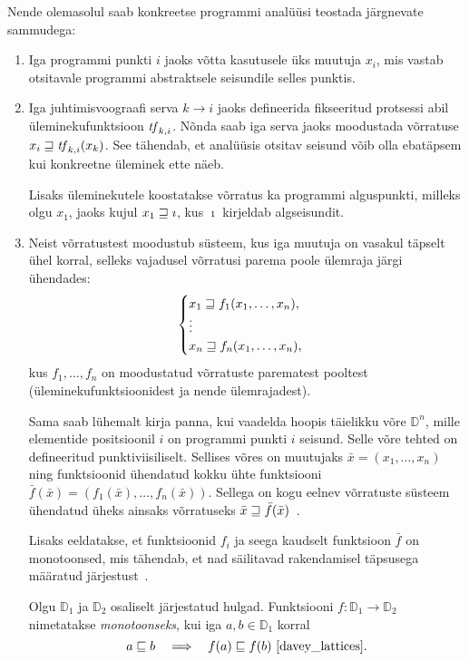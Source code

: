 \documentclass[../thesis.tex]{subfiles}
\begin{document}
Nende olemasolul saab konkreetse programmi analüüsi teostada järgnevate sammudega:
\begin{enumerate}
	\item Iga programmi punkti $i$ jaoks võtta kasutusele üks muutuja $x_i$, mis vastab otsitavale programmi abstraktsele seisundile selles punktis.

	\item Iga juhtimisvoograafi serva $k \rightarrow i$ jaoks defineerida fikseeritud protsessi abil üleminekufunktsioon $\mathit{tf}_{k,i}$. Nõnda saab iga serva jaoks moodustada võrratuse $x_i \sqsupseteq \mathit{tf}_{k,i}(x_k)$. See tähendab, et analüüsis otsitav seisund võib olla ebatäpsem kui konkreetne üleminek ette näeb.

	Lisaks üleminekutele koostatakse võrratus ka programmi alguspunkti, milleks olgu $x_1$, jaoks kujul $x_1 \sqsupseteq \imath$, kus $\imath$ kirjeldab algseisundit.

	\item Neist võrratustest moodustub süsteem, kus iga muutuja on vasakul täpselt ühel korral, selleks vajadusel võrratusi parema poole ülemraja järgi ühendades:
	\[
		\begin{cases}
			x_1 \sqsupseteq f_1(x_1, \ldots, x_n), \\
			\vdots \\
			x_n \sqsupseteq f_n(x_1, \ldots, x_n),
		\end{cases}
	\]
	kus $f_1, \ldots, f_n$ on moodustatud võrratuste parematest pooltest (üleminekufunktsioonidest ja nende ülemrajadest).

	Sama saab lühemalt kirja panna, kui vaadelda hoopis täielikku võre $\mathbb{D}^n$, mille elementide positsioonil $i$ on programmi punkti $i$ seisund. Selle võre tehted on defineeritud punktiviisiliselt.
	Sellises võres on muutujaks $\bar{x} = (x_1, \ldots, x_n)$ ning funktsioonid ühendatud kokku ühte funktsiooni $\bar{f}(\bar{x}) = (f_1(\bar{x}), \ldots, f_n(\bar{x}))$. Sellega on kogu eelnev võrratuste süsteem ühendatud üheks ainsaks võrratuseks $\bar{x} \sqsupseteq \bar{f}(\bar{x})$~\cite[21]{seidl_foundations}.

	Lisaks eeldatakse, et funktsioonid $f_i$ ja seega kaudselt funktsioon $\bar{f}$ on monotoonsed, mis tähendab, et nad säilitavad rakendamisel täpsusega määratud järjestust~\cite[20]{seidl_foundations}.

	\begin{definition}
	Olgu $\mathbb{D}_1$ ja $\mathbb{D}_2$ osaliselt järjestatud hulgad. Funktsiooni $f: \mathbb{D}_1 \to \mathbb{D}_2$ nimetatakse \emph{monotoonseks}, kui iga $a, b \in \mathbb{D}_1$ korral
	\[
		a \sqleq b \quad\Longrightarrow\quad f(a) \sqleq f(b)~\text{\cite[23]{davey_lattices}}.
	\]
	\end{definition}


\end{enumerate}
\end{document}
